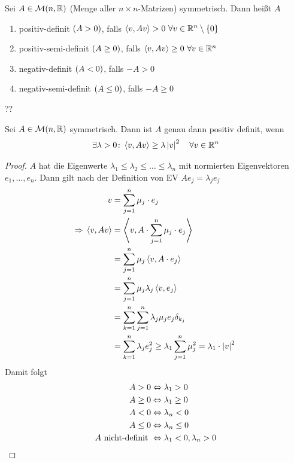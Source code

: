 \begin{definition}
    Sei $A\in\mM\of{n, \R}$ (Menge aller $n\times n$-Matrizen) symmetrisch. Dann heißt $A$
    \begin{enumerate}[label=(\roman*)]
        \item positiv-definit $\left(A > 0\right)$, falls $\left<v, Av\right> > 0~\forall v\in\mathbb{R}^n\setminus\left\{0\right\}$
        \item positiv-semi-definit $\left(A \geq 0\right)$, falls $\left<v, Av\right> \geq 0~\forall v\in\mathbb{R}^n$
        \item negativ-definit $\left(A < 0\right)$, falls $-A > 0$
        \item negativ-semi-definit $\left(A \leq 0\right)$, falls $-A \geq 0$
    \end{enumerate}
\end{definition}

\begin{bemerkung}
    ??
\end{bemerkung}

\begin{lemma}
    Sei $A\in\mM\of{n, \R}$ symmetrisch. Dann ist $A$ genau dann positiv definit, wenn
    \begin{align*}
        \exists \lambda > 0\colon \left<v, A v\right>\geq \lambda \left\lvert v\right\rvert^2\quad\forall v\in\mathbb{R}^n
    \end{align*}

    \begin{proof}
        $A$ hat die Eigenwerte $\lambda_1 \leq \lambda_2 \leq \dots \leq \lambda_n$ mit normierten Eigenvektoren $e_1, \ldots, e_n$. Dann gilt nach der Definition von EV $A e_j = \lambda _j e_j$
        \begin{align*}
            v &= \sum_{j=1}^{n} \mu_j \cdot e_j\\
            \Rightarrow{} \left<v, Av\right> &= \left<v, A\cdot \sum_{j=1}^{n} \mu_j\cdot e_j\right>\\
            &= \sum_{j=1}^{n} \mu_j \left<v, A\cdot e_j\right>\\
            &= \sum_{j=1}^{n} \mu_j \lambda _j \left<v, e_j\right>\\
            &= \sum_{k=1}^{n} \sum_{j=1}^{n} \lambda_j \mu_j e_j \delta_{k_j}\\
            &= \sum_{k=1}^{n} \lambda _j e_j^2 \geq \lambda_1 \sum_{j=1}^{n} \mu_j^2 = \lambda_1 \cdot\left\lvert v\right\rvert^2\qedhere
        \end{align*}
        Damit folgt
        \begin{align*}
            A > 0 &\Leftrightarrow{} \lambda_1 > 0\\
            A \geq 0 &\Leftrightarrow{} \lambda_1 \geq 0\\
            A < 0 &\Leftrightarrow{} \lambda_{n} < 0\\
            A \leq 0 &\Leftrightarrow{} \lambda_n \leq 0\\
            A\text{ nicht-definit } &\Leftrightarrow{} \lambda_1 < 0, \lambda_n > 0
        \end{align*}
    \end{proof}
\end{lemma}

